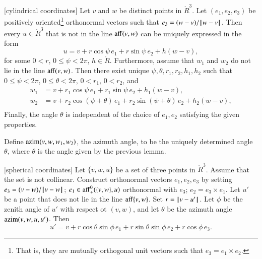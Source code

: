 \begin{lemma}[cylindrical coordinates]
Let $v$ and $w$ be distinct points in 
$\ring{R}^3$.  Let $(e_1,e_2,e_3)$ be positively oriented\footnote{That is, they are mutually orthogonal unit vectors such that $e_3 = e_1 \times e_2$.} orthonormal
vectors such that $e_3 = (w-v)/{\hskip0.1em|\hskip-0.15em|\hskip0.1em}w - v{\hskip0.1em|\hskip-0.15em|\hskip0.1em}$.
Then every
$u\in\ring{R}^3$ that is not in the line ${\operatorname{aff}}(v,w)$
can be uniquely expressed in the form
   $$
   u = v + r\cos\psi\, e_1 + r\sin\psi\, e_2 + h (w-v),
   $$
for some $0< r$, $0\le \psi < 2\pi$, $h\in\ring{R}$.
Furthermore,
assume that $w_1$ and $w_2$ do
not lie in the line ${\operatorname{aff}}(v,w)$.
Then there exist unique $\psi,\theta,r_1,r_2,h_1,h_2$
 such
that $0\le\psi<2\pi$, $0\le\theta < 2\pi$, $0 < r_1$, $0 < r_2$, and
  $$
  \begin{array}{lll}
    w_1 &= v + r_1\cos\psi\, e_1 + r_1\sin\psi\, e_2 + h_1(w-v),\\
    w_2 &= v + r_2\cos(\psi+\theta)\, e_1 + r_2\sin(\psi+\theta)\, e_2 
     + h_2(w-v),\\
\end{array}
  $$
Finally, the angle $\theta$ is independent of the choice of $e_1,e_2$
satisfying the given properties.
\end{lemma}

\begin{definition}[azim] 
Define ${\operatorname{azim}}(v,w,w_1,w_2)$, the azimuth angle, 
to be the uniquely determined
angle $\theta$, where $\theta$ is the angle given by the previous
lemma.
\end{definition}

\begin{lemma}[spherical coordinates]\label{lemma:sph}
Let $\{v,w,u\}$ be a set of three points in $\ring{R}^3$.
Assume that the set is not collinear.  
Construct orthonormal vectors  $e_1,e_2,e_3$ by setting
$e_3 = (v-w)/{\hskip0.1em|\hskip-0.15em|\hskip0.1em}v - w{\hskip0.1em|\hskip-0.15em|\hskip0.1em}$; 
$e_1\in{\operatorname{aff}}_+^0(\{v,w\},u)$ orthonormal with $e_3$;
$e_2 = e_3\times e_1$.
Let $u'$ be a point that does not
lie in the line ${\operatorname{aff}}\{v,w\}$.
Set $r = {\hskip0.1em|\hskip-0.15em|\hskip0.1em}v  -  u'{\hskip0.1em|\hskip-0.15em|\hskip0.1em}$. Let
$\phi$ be the zenith angle of $u'$ with respect ot $(v,w)$, and let
$\theta$ be the azimuth angle ${\operatorname{azim}}(v,w,u,u')$.  Then
   \begin{equation}
   u' = v + r \cos\theta \sin\phi\, e_1 + r \sin\theta\sin\phi\, e_2 +
   r\cos\phi\,e_3.
   \label{eqn:sph}
   \end{equation}
\end{lemma}

